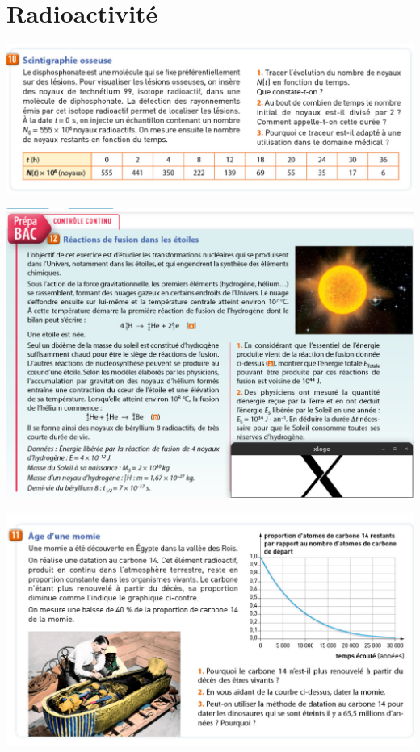 \documentclass[11pt]{exam}		%
\title{\Titre}
\newcommand{\Titre}{Radioactivité} %
\begin{document}
\thispagestyle{headandfoot}

\section{\Titre} %

\headrule
\footrule
\setlength{\columnsep}{0.25cm}
\setlength{\columnseprule}{1pt}

\consignes

\begin{center}
	\includegraphics[scale=0.5]{ex1.png}
\end{center}


\begin{center}
	\includegraphics[scale=0.4]{ex2.png}
\end{center}


\begin{center}
	\includegraphics[scale=0.4]{ex_datationC14.png}
\end{center}


\end{document}
